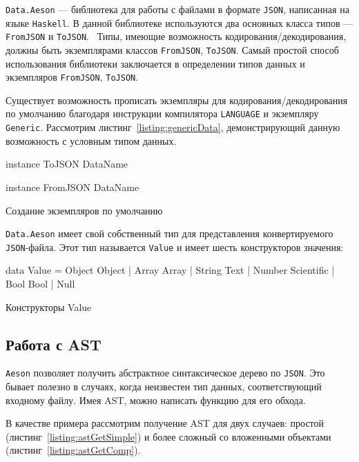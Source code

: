 \lstinline{Data.Aeson} --- библиотека для работы с файлами в формате \lstinline{JSON}, написанная на языке \lstinline{Haskell}. В данной  библиотеке используются два основных класса типов --- \lstinline{FromJSON} и \lstinline{ToJSON}.~\cite{aesonEx} Типы, имеющие возможность кодирования/декодирования, должны быть экземплярами классов \lstinline{FromJSON}, \lstinline{ToJSON}. Самый простой способ использования библиотеки заключается в определении типов данных и экземпляров \lstinline{FromJSON}, \lstinline{ToJSON}. 

Существует возможность прописать экземпляры для кодирования/декодирования по умолчанию благодаря инструкции компилятора \lstinline{LANGUAGE} и экземпляру \lstinline{Generic}. Рассмотрим листинг~\ref{listing:genericData}, демонстрирующий данную возможность с условным типом данных. 

\begin{ListingEnv}[H]
\begin{Verb}
instance ToJSON DataName

instance FromJSON DataName
\end{Verb}
\caption{Создание экземпляров по умолчанию}
\label{listing:genericData}
\end{ListingEnv}

\lstinline{Data.Aeson} имеет свой собственный тип для представления конвертируемого \lstinline{JSON}-файла. Этот тип называется \lstinline{Value} и имеет шесть конструкторов значения:

\begin{ListingEnv}[H]
\begin{Verb}
data Value
  = Object Object
  | Array Array
  | String Text
  | Number Scientific
  | Bool Bool
  | Null
\end{Verb}
\caption{Конструкторы Value}
\label{listing:value}
\end{ListingEnv}

\subsection{Работа с AST}

\lstinline{Aeson} позволяет получить абстрактное синтаксическое дерево по \lstinline{JSON}. Это бывает полезно в случаях, когда неизвестен тип данных, соответствующий входному файлу. Имея AST, можно написать функцию для его обхода.~\cite{aesonEx}

В качестве примера рассмотрим получение AST для двух случаев: простой (листинг~\ref{listing:astGetSimple}) и более сложный со вложенными объектами (листинг~\ref{listing:astGetComp}).

